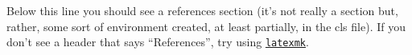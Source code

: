 \documentclass[utf8]{my_class_1_frontiers_vanc}  %
\begin{document}
Below this line you should see a references section (it's not really a section but, rather, some
sort of environment created, at least partially, in the cls file). If you don't see a header that
says ``References'', 
try using \href{https://www.cantab.net/users/johncollins/latexmk/index.html}{\tt latexmk}.


%  


 



\end{document}
